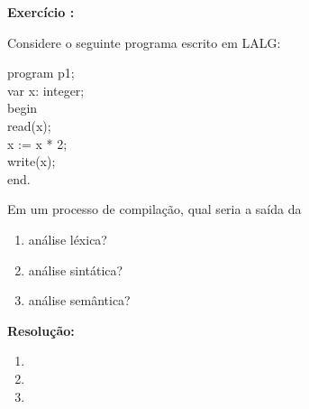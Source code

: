 

\setcounter{count}{0}
\renewcommand{\labelenumi}{\alph{enumi}.}
\newcommand{\exercise}[2]{%
  \stepcounter{count}%
  \noindent\textbf{Exercício \thecount:}

  #1
  
  \noindent\textbf{Resolução:}%
  
  #2 
  
}


\maketitle

\exercise{
	Considere o seguinte programa escrito em LALG:

	program p1;\\
	var x: integer;\\
	begin\\
	\hspace*{2em} read(x);\\
	\hspace*{2em} x := x * 2;\\
	\hspace*{2em} write(x);\\
	end.

	Em um processo de compilação, qual seria a saída da

	\begin{enumerate}
		\item análise léxica?
		\item análise sintática?
		\item análise semântica?
	\end{enumerate}
} {
	\begin{enumerate}
		\item
		\item
		\item
	\end{enumerate}
}

